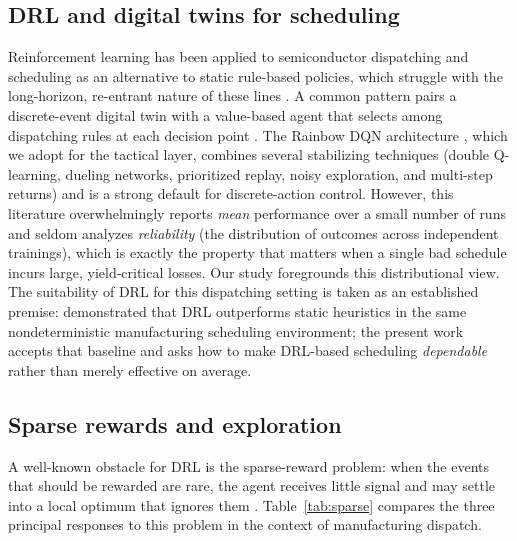 \documentclass[10pt]{article}
\begin{document}
\subsection{DRL and digital twins for scheduling}
Reinforcement learning has been applied to semiconductor dispatching and scheduling
as an alternative to static rule-based policies, which struggle with the
long-horizon, re-entrant nature of these lines \parencite{waschneck2018,hu2019}.
A common pattern pairs a discrete-event digital twin with a value-based agent
that selects among dispatching rules at each decision point \parencite{lee2025}. The
Rainbow DQN architecture \parencite{hessel2018}, which we adopt for the tactical
layer, combines several stabilizing techniques (double Q-learning, dueling
networks, prioritized replay, noisy exploration, and multi-step returns) and is a
strong default for discrete-action control. However, this literature
overwhelmingly reports \emph{mean} performance over a small number of runs and
seldom analyzes \emph{reliability} (the distribution of outcomes across
independent trainings), which is exactly the property that matters when a single
bad schedule incurs large, yield-critical losses. Our study foregrounds this
distributional view. The suitability of DRL for this dispatching setting is
taken as an established premise: \textcite{lee2025} demonstrated that DRL
outperforms static heuristics in the same nondeterministic manufacturing scheduling
environment; the present work accepts that baseline and asks how to make
DRL-based scheduling \emph{dependable} rather than merely effective on average.

\subsection{Sparse rewards and exploration}
A well-known obstacle for DRL is the sparse-reward problem: when the events that
should be rewarded are rare, the agent receives little signal and may settle into
a local optimum that ignores them \parencite{pathak2017}. Table~\ref{tab:sparse}
compares the three principal responses to this problem in the context of
manufacturing dispatch.
\end{document}
